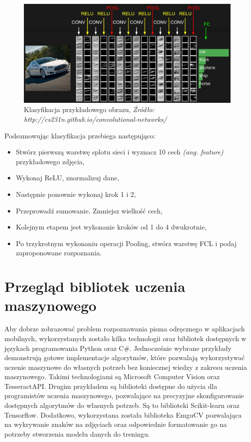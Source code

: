 \documentclass[brudnopis]{xmgr}
\begin{document}
\begin{figure}[!tbh]
\centering
\includegraphics[width=.8\hsize]{fig/convnet}
\caption{Klasyfikacja przykładowego obrazu, \emph{Źródło: http://cs231n.github.io/convolutional-networks/}}
\end{figure}

Podsumowując klasyfikacja przebiega następująco:
\begin{itemize}
\item
Stwórz pierwszą warstwę splotu sieci i wyznacz 10 cech \emph{(ang. feature)} przykładowego zdjęcia,
\item
Wykonaj ReLU, znormalizuj dane,
\item
Następnie ponownie wykonaj krok 1 i 2,
\item
Przeprowadź sumowanie. Zmniejsz wielkość cech,
\item
Kolejnym etapem jest wykonanie kroków od 1 do 4 dwukrotnie,
\item
Po trzykrotnym wykonaniu operacji Pooling, stwórz warstwę FCL i podaj zaproponowane rozpoznania.
\end{itemize}

\chapter{Przegląd bibliotek uczenia maszynowego}
Aby dobrze zobrazować problem rozpoznawania pisma odręcznego w aplikacjach mobilnych, wykorzystanych zostało kilka technologii oraz bibliotek dostępnych w językach programowania Python oraz C\#. Jednocześnie wybrane przykłady demonstrują gotowe implementacje algorytmów, które pozwalają wykorzystywać uczenie maszynowe do własnych potrzeb bez koniecznej wiedzy z zakresu uczenia maszynowego. Takimi technologiami są Microsoft Computer Vision\cite{9} oraz TesseractAPI\cite{10}. Drugim przykładem są biblioteki dostępne do użycia dla programistów uczenia maszynowego, pozwalające na precyzyjne skonfigurowanie dostępnych algorytmów do własnych potrzeb. Są to biblioteki Scikit-learn oraz Tensorflow. Dodatkowo, wykorzystana została biblioteka EmguCV pozwalająca na wykrywanie znaków na zdjęciach oraz odpowiednie formatowanie go na potrzeby stworzenia modelu danych do treningu.
\end{document}
